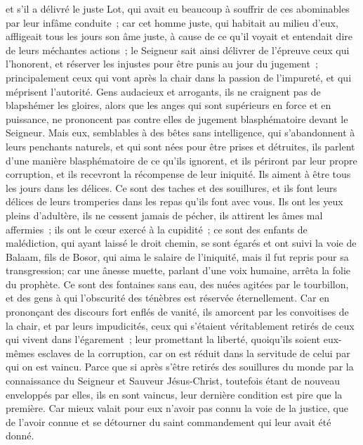 \begin{multicols}{2}
et s'il a délivré le juste Lot, qui avait eu beaucoup à souffrir de ces abominables par leur infâme conduite~;
car cet homme juste, qui habitait au milieu d'eux, affligeait tous les jours son âme juste, à cause de ce qu'il voyait et entendait dire de leurs méchantes actions~;
le Seigneur sait ainsi délivrer de l'épreuve ceux qui l'honorent, et réserver les injustes pour être punis au jour du jugement~;
principalement ceux qui vont après la chair dans la passion de l'impureté, et qui méprisent l'autorité. Gens audacieux et arrogants, ils ne craignent pas de blapshémer les gloires,
alors que les anges qui sont supérieurs en force et en puissance, ne prononcent pas contre elles de jugement blasphématoire devant le Seigneur.
Mais eux, semblables à des bêtes sans intelligence, qui s'abandonnent à leurs penchants naturels, et qui sont nées pour être prises et détruites, ils parlent d'une manière blasphématoire de ce qu'ils ignorent, et ils périront par leur propre corruption,
et ils recevront la récompense de leur iniquité. Ils aiment à être tous les jours dans les délices. Ce sont des taches et des souillures, et ils font leurs délices de leurs tromperies dans les repas qu'ils font avec vous.
Ils ont les yeux pleins d'adultère, ils ne cessent jamais de pécher, ils attirent les âmes mal affermies~; ils ont le cœur exercé à la cupidité~; ce sont des enfants de malédiction,
qui ayant laissé le droit chemin, se sont égarés et ont suivi la voie de Balaam, fils de Bosor, qui aima le salaire de l'iniquité, mais il fut repris pour sa transgression;
car une ânesse muette, parlant d'une voix humaine, arrêta la folie du prophète.
Ce sont des fontaines sans eau, des nuées agitées par le tourbillon, et des gens à qui l'obscurité des ténèbres est réservée éternellement.
Car en prononçant des discours fort enflés de vanité, ils amorcent par les convoitises de la chair, et par leurs impudicités, ceux qui s'étaient véritablement retirés de ceux qui vivent dans l'égarement~;
leur promettant la liberté, quoiqu'ils soient eux-mêmes esclaves de la corruption, car on est réduit dans la servitude de celui par qui on est vaincu.
Parce que si après s'être retirés des souillures du monde par la connaissance du Seigneur et Sauveur Jésus-Christ, toutefois étant de nouveau enveloppés par elles, ils en sont vaincus, leur dernière condition est pire que la première.
Car mieux valait pour eux n'avoir pas connu la voie de la justice, que de l'avoir connue et se détourner du saint commandement qui leur avait été donné.

\end{multicols}
